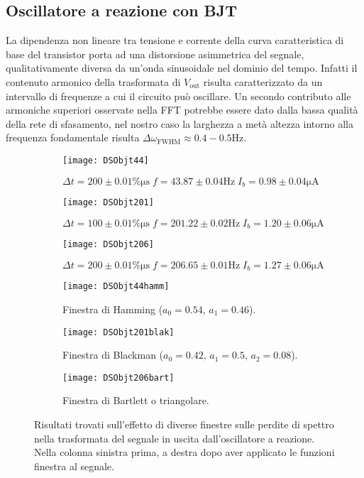 \documentclass{article}[a4paper, oneside, 11pt]
\begin{document}
\subsection{Oscillatore a reazione con BJT}
La dipendenza non lineare tra tensione e corrente della curva caratteristica
di base del transistor porta ad una distorsione asimmetrica del segnale, 
qualitativamente diversa da un'onda sinusoidale nel dominio del tempo.
Infatti il contenuto armonico della trasformata di $V_{\text{out}}$ risulta
caratterizzato da un intervallo di frequenze a cui il circuito può
oscillare. Un secondo contributo alle armoniche superiori osservate nella
FFT potrebbe essere dato dalla bassa qualità della rete di sfasamento,
nel nostro caso la larghezza a metà altezza intorno alla frequenza
fondamentale risulta $\Delta \omega_{\text{FWHM}} \approx 0.4 - 0.5 \si{\Hz}$. 
\begin{figure}[!htb]
\centering
	\begin{subfigure}{.5\textwidth}
	\texttt{[image: DSObjt44]}
	\caption{$\Delta t = 200 \pm 0.01 \% \si{\micro\s} \; f = 43.87
	\pm 0.04 \si{\Hz} \; I_b = 0.98 \pm 0.04 \si{\uA}$}
	\texttt{[image: DSObjt201]}
	\caption{$\Delta t = 100 \pm 0.01 \% \si{\micro\s} \; f = 201.22
	\pm 0.02 \si{\Hz} \; I_b = 1.20 \pm 0.06 \si{\uA}$}
	\texttt{[image: DSObjt206]}
	\caption{$\Delta t = 200 \pm 0.01 \% \si{\micro\s} \; f = 206.65
	\pm 0.01 \si{\Hz} \; I_b = 1.27 \pm 0.06 \si{\uA}$}
\label{fig: BJTin}
	\end{subfigure}%
	\begin{subfigure}{.5\textwidth}
	\texttt{[image: DSObjt44hamm]}
	\caption{Finestra di Hamming ($a_0 = 0.54, \, a_1 = 0.46$).}
	\texttt{[image: DSObjt201blak]}
	\caption{Finestra di Blackman ($a_0 = 0.42, \, a_1 = 0.5, \, a_2 = 0.08$).}
	\texttt{[image: DSObjt206bart]}
	\caption{Finestra di Bartlett o triangolare.}
\label{fig: BJTwin}
	\end{subfigure}%
	\caption{Risultati trovati sull'effetto di diverse finestre	sulle
			perdite di spettro nella trasformata del segnale in uscita
		 	dall'oscillatore a reazione.
			Nella colonna sinistra prima, a destra dopo aver applicato
			le funzioni finestra al segnale. \label{fig: BJTall}}
\end{figure}
\end{document}
